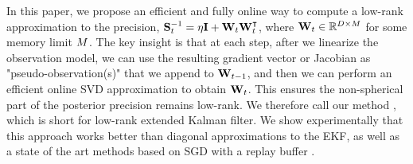 In this paper, we propose an efficient and fully online way to compute a low-rank approximation to the precision, $\mathbf{S}_t^{-1} = \eta\mathbf{I} + \mathbf{W}_t\mathbf{W}_t^\intercal$, where $\mathbf{W}_t\in\mathbb{R}^{D \times M}$ for some memory limit $M$.
The key insight is that at each step, after we linearize the observation model, we can use the resulting gradient vector or Jacobian as "pseudo-observation(s)" that we append to $\mathbf{W}_{t-1}$, and then we can perform an efficient online SVD approximation to obtain $\mathbf{W}_t$.
This ensures the non-spherical part of the posterior precision remains low-rank.
We therefore call our method \lofi,
which is short for low-rank extended Kalman filter.
We show experimentally that this approach works better than diagonal approximations to the EKF,
as well as a state of the art methods
based on  SGD  with a replay buffer
 \citep{Cai2021}.


    











